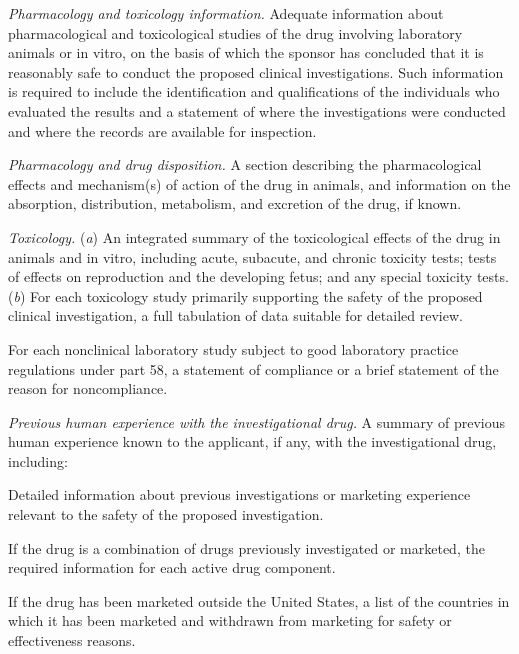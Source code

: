 \begin{description}[leftmargin=0.5cm,style=sameline]
\item[(8)] \textit{Pharmacology and toxicology information.} Adequate information about pharmacological and toxicological studies of the drug involving laboratory animals or in vitro, on the basis of which the sponsor has concluded that it is reasonably safe to conduct the proposed clinical investigations. Such information is required to include the identification and qualifications of the individuals who evaluated the results and a statement of where the investigations were conducted and where the records are available for inspection.
\begin{description}[leftmargin=0.8cm,style=sameline]
\item[(i)] \textit{Pharmacology and drug disposition.} A section describing the pharmacological effects and mechanism(s) of action of the drug in animals, and information on the absorption, distribution, metabolism, and excretion of the drug, if known.
\item[(ii)] \textit{Toxicology.} (\textit{a}) An integrated summary of the toxicological effects of the drug in animals and in vitro, including acute, subacute, and chronic toxicity tests; tests of effects on reproduction and the developing fetus; and any special toxicity tests. (\textit{b}) For each toxicology study primarily supporting the safety of the proposed clinical investigation, a full tabulation of data suitable for detailed review.
\item[(iii)] For each nonclinical laboratory study subject to good laboratory practice regulations under part 58, a statement of compliance or a brief statement of the reason for noncompliance.
\end{description}

\item[(9)] \textit{Previous human experience with the investigational drug.} A summary of previous human experience known to the applicant, if any, with the investigational drug, including:
\begin{description}[leftmargin=0.8cm,style=sameline]
\item[(i)] Detailed information about previous investigations or marketing experience relevant to the safety of the proposed investigation.
\item[(ii)] If the drug is a combination of drugs previously investigated or marketed, the required information for each active drug component.
\item[(iii)] If the drug has been marketed outside the United States, a list of the countries in which it has been marketed and withdrawn from marketing for safety or effectiveness reasons.
\end{description}


\end{description}
